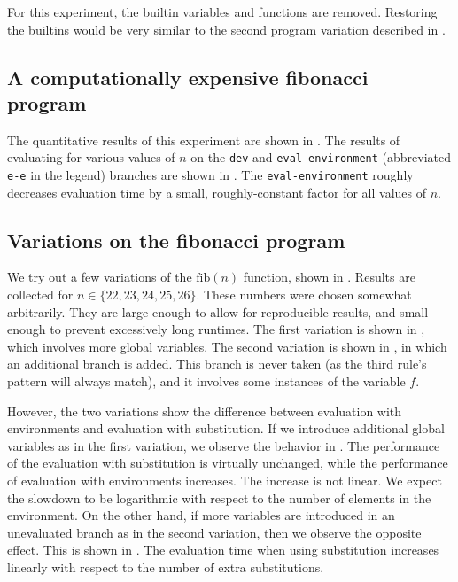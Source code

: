 For this experiment, the builtin variables and functions are removed. Restoring the builtins would be very similar to the second program variation described in .

\subsection{A computationally expensive fibonacci program}
\label{sec:eval-fib}

The quantitative results of this experiment are shown in . The results of evaluating  for various values of $n$ on the \texttt{dev} and \texttt{eval-environment} (abbreviated \texttt{e-e} in the legend) branches are shown in . The \texttt{eval-environment} roughly decreases evaluation time by a small, roughly-constant factor for all values of $n$.

\subsection{Variations on the fibonacci program}
\label{sec:eval-fib-variations}

We try out a few variations of the $\text{fib}(n)$ function, shown in . Results are collected for $n\in\{22,23,24,25,26\}$. These numbers were chosen somewhat arbitrarily. They are large enough to allow for reproducible results, and small enough to prevent excessively long runtimes. The first variation is shown in , which involves more global variables. The second variation is shown in , in which an additional branch is added. This branch is never taken (as the third rule's pattern will always match), and it involves some instances of the variable $f$.

However, the two variations show the difference between evaluation with environments and evaluation with substitution. If we introduce additional global variables as in the first variation, we observe the behavior in . The performance of the evaluation with substitution is virtually unchanged, while the performance of evaluation with environments increases. The increase is not linear. We expect the slowdown to be logarithmic with respect to the number of elements in the environment. On the other hand, if more variables are introduced in an unevaluated branch as in the second variation, then we observe the opposite effect. This is shown in . The evaluation time when using substitution increases linearly with respect to the number of extra substitutions.

